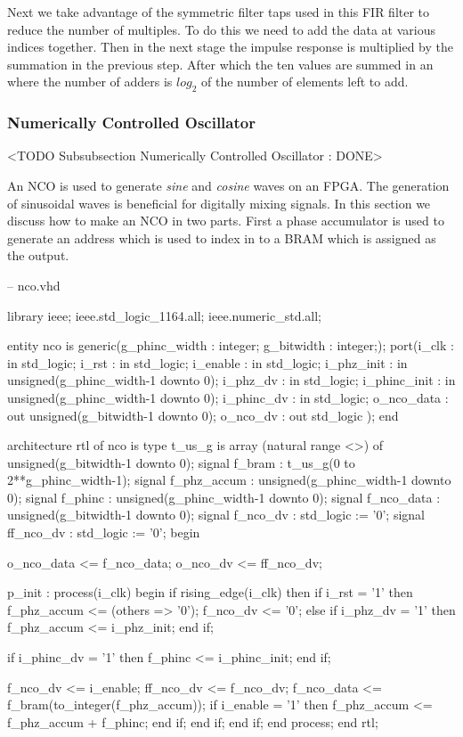 Next we take advantage of the symmetric filter taps used in this \ac{FIR} filter to reduce the number of multiples. To do this we need to add the data at various indices together. Then in the next stage the impulse response is multiplied by the summation in the previous step. After which the ten values are summed in an  where the number of adders is $log_2$ of the number of elements left to add. 
	
\subsubsection{Numerically Controlled Oscillator}
	<TODO Subsubsection  Numerically Controlled Oscillator : DONE>
	
An \ac{NCO} is used to generate \emph{sine} and \emph{cosine} waves on an \ac{FPGA}. The generation of sinusoidal waves is beneficial for digitally mixing signals. In this section we discuss how to make an \ac{NCO} in two parts. First a phase accumulator is used to generate an address which is used to index in to a \ac{BRAM} which is assigned as the output. 

\begin{VHDLlisting}[tabsize=2]
-- nco.vhd

library ieee;
	ieee.std_logic_1164.all;
	ieee.numeric_std.all;
	
entity nco is
generic(g_phinc_width : integer;
	    g_bitwidth    : integer;);
port(i_clk        : in    std_logic;
	 i_rst        : in    std_logic;
	 i_enable     : in    std_logic;
	 i_phz_init   : in    unsigned(g_phinc_width-1 downto 0);
	 i_phz_dv     : in    std_logic;
	 i_phinc_init : in    unsigned(g_phinc_width-1 downto 0);
	 i_phinc_dv   : in    std_logic;
	 o_nco_data   :   out unsigned(g_bitwidth-1 downto 0);
	 o_nco_dv     :   out std_logic
);
end 

architecture rtl of nco is
	type t_us_g is array (natural range <>) of unsigned(g_bitwidth-1 downto 0);
	signal f_bram       : t_us_g(0 to 2**g_phinc_width-1);
	signal f_phz_accum  : unsigned(g_phinc_width-1 downto 0);
	signal f_phinc      : unsigned(g_phinc_width-1 downto 0);
	signal f_nco_data   : unsigned(g_bitwidth-1 downto 0);
	signal f_nco_dv     : std_logic := '0';
	signal ff_nco_dv    : std_logic := '0';
begin

	o_nco_data <= f_nco_data;
	o_nco_dv   <= ff_nco_dv;
	
	p_init : process(i_clk)
	begin
		if rising_edge(i_clk) then
			if i_rst = '1' then
				f_phz_accum <= (others => '0');
				f_nco_dv <= '0';
			else
				if i_phz_dv = '1' then
					f_phz_accum <= i_phz_init;
				end if;
				
				if i_phinc_dv = '1' then
					f_phinc <= i_phinc_init;
				end if;
				
				f_nco_dv <= i_enable;
				ff_nco_dv <= f_nco_dv;
				f_nco_data <= f_bram(to_integer(f_phz_accum));
				if i_enable = '1' then
					f_phz_accum <= f_phz_accum + f_phinc;
				end if;				
			end if;
		end if;	
	end process;
end rtl;
\end{VHDLlisting}

